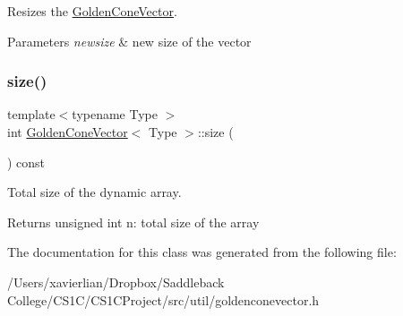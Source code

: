 Resizes the \mbox{\hyperlink{class_golden_cone_vector}{Golden\+Cone\+Vector}}. 


\begin{DoxyParams}{Parameters}
{\em newsize} & new size of the vector \\
\hline
\end{DoxyParams}
\mbox{\label{class_golden_cone_vector_aa6aaef86e5c3481c1423d37c41c9db33}} 
\subsubsection{\texorpdfstring{size()}{size()}}
{\footnotesize\ttfamily template$<$typename Type $>$ \\
int \mbox{\hyperlink{class_golden_cone_vector}{Golden\+Cone\+Vector}}$<$ Type $>$\+::size (\begin{DoxyParamCaption}{ }\end{DoxyParamCaption}) const}



Total size of the dynamic array. 

\begin{DoxyReturn}{Returns}
unsigned int n\+: total size of the array 
\end{DoxyReturn}


The documentation for this class was generated from the following file\+:\begin{DoxyCompactItemize}
\item 
/\+Users/xavierlian/\+Dropbox/\+Saddleback College/\+C\+S1\+C/\+C\+S1\+C\+Project/src/util/goldenconevector.\+h\end{DoxyCompactItemize}
